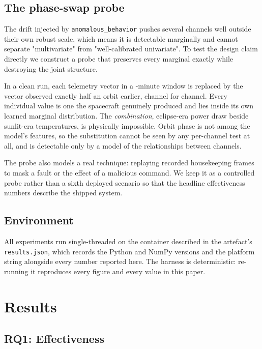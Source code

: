 \documentclass[conference]{IEEEtran}
\begin{document}
\subsection{The phase-swap probe}
\label{sec:probe}

The drift injected by \texttt{anomalous\_behavior} pushes several channels well
outside their own robust scale, which means it is detectable marginally and
cannot separate "multivariate" from "well-calibrated univariate". To test the
design claim directly we construct a probe that preserves every marginal exactly
while destroying the joint structure.

In a clean run, each telemetry vector in a \expSwapWindowMin-minute window is
replaced by the vector observed exactly half an orbit earlier, channel for
channel. Every individual value is one the spacecraft genuinely produced and
lies inside its own learned marginal distribution. The \emph{combination},
eclipse-era power draw beside sunlit-era temperatures, is physically
impossible. Orbit phase is not among the model's features, so the substitution
cannot be seen by any per-channel test at all, and is detectable only by a
model of the relationships between channels.

The probe also models a real technique: replaying recorded housekeeping frames
to mask a fault or the effect of a malicious command. We keep it as a controlled
probe rather than a sixth deployed scenario so that the headline effectiveness
numbers describe the shipped system.

\subsection{Environment}

All experiments run single-threaded on the container described in the artefact's
\texttt{results.json}, which records the Python and NumPy versions and the
platform string alongside every number reported here. The harness is
deterministic: re-running it reproduces every figure and every value in this
paper.

\section{Results}
\label{sec:results}

\subsection{RQ1: Effectiveness}
\end{document}
